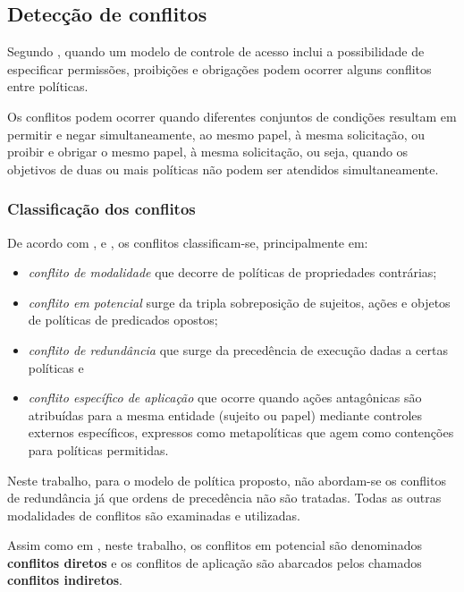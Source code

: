 \subsection{Detecção de conflitos} \label{deteccao_conflitos}

Segundo \cite{kalam_organization_2003}, quando um modelo de controle de acesso inclui a possibilidade de especificar permissões, proibições e obrigações podem ocorrer alguns conflitos entre políticas. 

Os conflitos podem ocorrer quando diferentes conjuntos de condições resultam em permitir e negar simultaneamente, ao mesmo papel, à mesma solicitação, ou proibir e obrigar o mesmo papel, à mesma solicitação, ou seja, quando os objetivos de duas ou mais políticas não podem ser atendidos simultaneamente. \cite{cuppens_high_2007}

\subsubsection{Classificação dos conflitos}

De acordo com \cite{cuppens_high_2007}, \cite{sloman_security_2002} e \cite{lupu_conflicts_1999}, os conflitos classificam-se, principalmente em: \begin{itemize}
	\item \textit{conflito de modalidade} que decorre de políticas de propriedades contrárias; 
	\item \textit{conflito em potencial} surge da tripla sobreposição de sujeitos, ações e objetos de políticas de predicados opostos;
	\item \textit{conflito de redundância} que surge da precedência de execução dadas a certas políticas e
	\item \textit{conflito específico de aplicação} que ocorre quando ações antagônicas são atribuídas para a mesma entidade (sujeito ou papel) mediante controles externos específicos, expressos como metapolíticas que agem como contenções para políticas permitidas.
\end{itemize}

Neste trabalho, para o modelo de política proposto, não abordam-se os conflitos de redundância já que ordens de precedência não são tratadas. Todas as outras modalidades de conflitos são examinadas e utilizadas.

Assim como em \cite[p. 24]{sarkis2017}, neste trabalho, os conflitos em potencial são denominados \textbf{conflitos diretos} e os conflitos de aplicação são abarcados pelos chamados \textbf{conflitos indiretos}.

